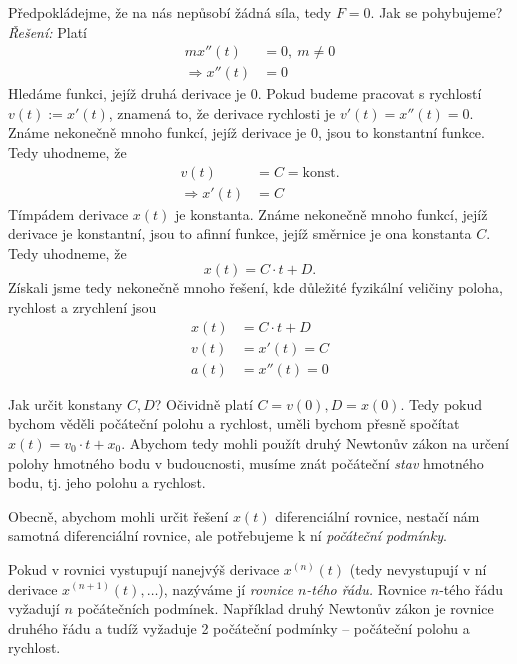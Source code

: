 \begin{příklad}
Předpokládejme, že na nás nepůsobí žádná síla, tedy $F=0$. Jak se pohybujeme? \\
\textit{Řešení:} Platí
\begin{align*}
	mx''(t)&=0,\ m\neq 0 \\
	\Rightarrow  x''(t)&=0
\end{align*}
Hledáme funkci, jejíž druhá derivace je $0$. Pokud budeme pracovat s rychlostí $v(t):=x'(t)$, znamená to, že derivace rychlosti je $v'(t)=x''(t)=0.$ Známe nekonečně mnoho funkcí, jejíž derivace je $0$, jsou to konstantní funkce. Tedy uhodneme, že 
\begin{align*}
	v(t) &= C = \text{konst.} \\
	\Rightarrow x'(t) &= C
\end{align*}
Tímpádem derivace $x(t)$ je konstanta. Známe nekonečně mnoho funkcí, jejíž derivace je konstantní, jsou to afinní funkce, jejíž směrnice je ona konstanta $C$. Tedy uhodneme, že
\begin{equation*}
  x(t) = C\cdot t+D.
\end{equation*}
Získali jsme tedy nekonečně mnoho řešení, kde důležité fyzikální veličiny poloha, rychlost a zrychlení jsou
\begin{align*}
	x(t) &= C\cdot t + D \\
	v(t) &= x'(t) = C \\
	a(t) &= x''(t) = 0
\end{align*}

Jak určit konstany $C,D$? Očividně platí $C=v(0), D=x(0)$. Tedy pokud bychom věděli počáteční polohu a rychlost, uměli bychom přesně spočítat $x(t)=v_0\cdot t+x_0.$ Abychom tedy mohli použít druhý Newtonův zákon na určení polohy hmotného bodu v budoucnosti, musíme znát počáteční \textit{stav} hmotného bodu, tj. jeho polohu a rychlost.

Obecně, abychom mohli určit řešení $x(t)$ diferenciální rovnice, nestačí nám samotná diferenciální rovnice, ale potřebujeme k ní \textit{počáteční podmínky}.
\end{příklad}

Pokud v rovnici vystupují nanejvýš derivace $x^{(n)}(t)$ (tedy nevystupují v ní derivace $x^{(n+1)}(t), \hdots$), nazýváme jí \textit{rovnice $n$-tého řádu.} Rovnice $n$-tého řádu vyžadují $n$ počátečních podmínek. Například druhý Newtonův zákon je rovnice druhého řádu a tudíž vyžaduje 2 počáteční podmínky -- počáteční polohu a rychlost.

